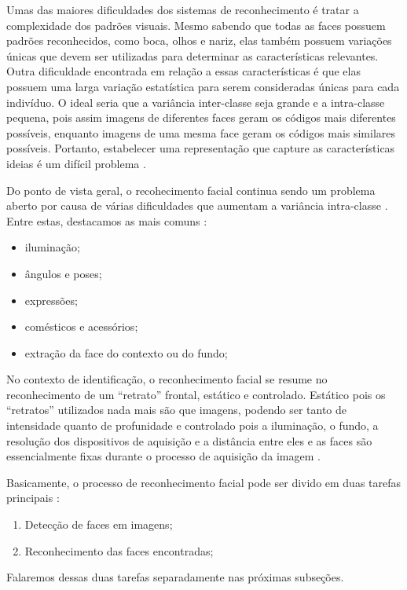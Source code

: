 Umas das maiores dificuldades dos sistemas de reconhecimento é tratar a complexidade dos padrões visuais. Mesmo sabendo que todas as faces possuem padrões reconhecidos, como boca, olhos e nariz, elas também possuem variações únicas que devem ser utilizadas para determinar as características relevantes. Outra dificuldade encontrada em relação a essas características é que elas possuem uma larga variação estatística para serem consideradas únicas para cada indivíduo. O ideal seria que a variância inter-classe seja grande e a intra-classe pequena, pois assim imagens de diferentes faces geram os códigos mais diferentes possíveis, enquanto imagens de uma mesma face geram os códigos mais similares possíveis. Portanto, estabelecer uma representação que capture as características ideias é um difícil problema \cite{saocarlos}.

Do ponto de vista geral, o recohecimento facial continua sendo um problema aberto por causa de várias dificuldades que aumentam a variância intra-classe \cite{hong}. Entre estas, destacamos as mais comuns \cite{saocarlos}:

	\begin{itemize}
		\item iluminação;
		\item ângulos e poses;
		\item expressões;
		\item comésticos e acessórios;
		\item extração da face do contexto ou do fundo;
	\end{itemize}

No contexto de identificação, o reconhecimento facial se resume no reconhecimento de um ``retrato'' frontal, estático e controlado. Estático pois os ``retratos'' utilizados nada mais são que imagens, podendo ser tanto de intensidade quanto de profunidade e controlado pois a iluminação, o fundo, a resolução dos dispositivos de aquisição e a distância entre eles e as faces são essencialmente fixas durante o processo de aquisição da imagem \cite{hong}.

Basicamente, o processo de reconhecimento facial pode ser divido em duas tarefas principais \cite{hong}:

	\begin{enumerate}
		\item Detecção de faces em imagens;
		\item Reconhecimento das faces encontradas;
	\end{enumerate}

Falaremos dessas duas tarefas separadamente nas próximas subseções.


